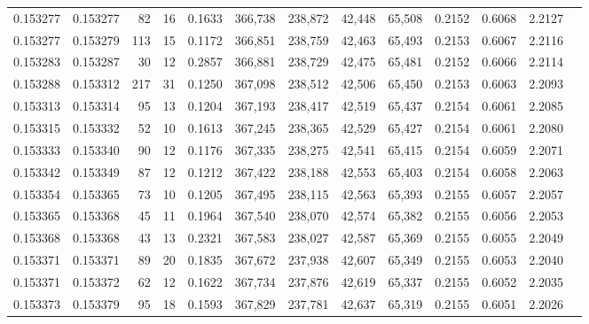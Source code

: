 \begin{tabular}{rrrrrrrrrrrrr}
0.153277 & 0.153277 &    82 &  16 &                                     0.1633 & 366,738 & 238,872 &  42,448 &  65,508 & 0.2152 & 0.6068 & 2.2127 \\
0.153277 & 0.153279 &   113 &  15 &                                     0.1172 & 366,851 & 238,759 &  42,463 &  65,493 & 0.2153 & 0.6067 & 2.2116 \\
0.153283 & 0.153287 &    30 &  12 &                                     0.2857 & 366,881 & 238,729 &  42,475 &  65,481 & 0.2152 & 0.6066 & 2.2114 \\
0.153288 & 0.153312 &   217 &  31 &                                     0.1250 & 367,098 & 238,512 &  42,506 &  65,450 & 0.2153 & 0.6063 & 2.2093 \\
0.153313 & 0.153314 &    95 &  13 &                                     0.1204 & 367,193 & 238,417 &  42,519 &  65,437 & 0.2154 & 0.6061 & 2.2085 \\
0.153315 & 0.153332 &    52 &  10 &                                     0.1613 & 367,245 & 238,365 &  42,529 &  65,427 & 0.2154 & 0.6061 & 2.2080 \\
0.153333 & 0.153340 &    90 &  12 &                                     0.1176 & 367,335 & 238,275 &  42,541 &  65,415 & 0.2154 & 0.6059 & 2.2071 \\
0.153342 & 0.153349 &    87 &  12 &                                     0.1212 & 367,422 & 238,188 &  42,553 &  65,403 & 0.2154 & 0.6058 & 2.2063 \\
0.153354 & 0.153365 &    73 &  10 &                                     0.1205 & 367,495 & 238,115 &  42,563 &  65,393 & 0.2155 & 0.6057 & 2.2057 \\
0.153365 & 0.153368 &    45 &  11 &                                     0.1964 & 367,540 & 238,070 &  42,574 &  65,382 & 0.2155 & 0.6056 & 2.2053 \\
0.153368 & 0.153368 &    43 &  13 &                                     0.2321 & 367,583 & 238,027 &  42,587 &  65,369 & 0.2155 & 0.6055 & 2.2049 \\
0.153371 & 0.153371 &    89 &  20 &                                     0.1835 & 367,672 & 237,938 &  42,607 &  65,349 & 0.2155 & 0.6053 & 2.2040 \\
0.153371 & 0.153372 &    62 &  12 &                                     0.1622 & 367,734 & 237,876 &  42,619 &  65,337 & 0.2155 & 0.6052 & 2.2035 \\
0.153373 & 0.153379 &    95 &  18 &                                     0.1593 & 367,829 & 237,781 &  42,637 &  65,319 & 0.2155 & 0.6051 & 2.2026 \\

\end{tabular}
